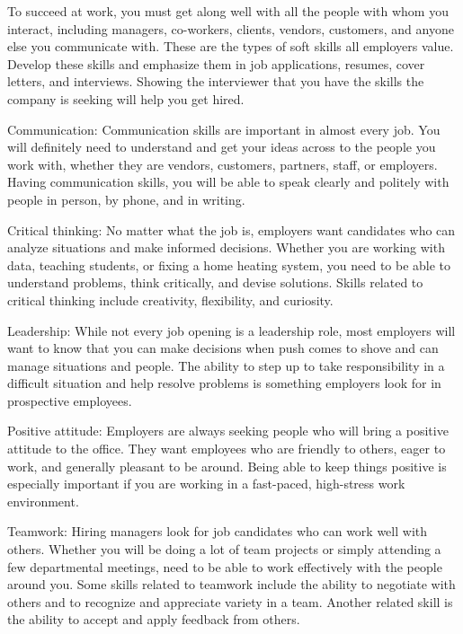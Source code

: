 \documentclass[12pt,a4paper,twoside]{article}
\newenvironment{readingpassage}[1][]{%
    \begin{tcolorbox}[enhanced, colback=grayLight, colframe=secondaryBlue,
        coltitle=textDark, fonttitle=\bfseries, title={#1},
        rounded corners, arc=3mm, boxrule=1pt,
        left=15pt, right=15pt, top=10pt, bottom=10pt,
        breakable, before skip=10pt, after skip=10pt, drop fuzzy shadow]
    \setstretch{1.3}
}{\end{tcolorbox}}
\begin{document}
\begin{readingpassage}[]
To succeed at work, you must get along well with all the people with whom you interact, including managers, co-workers, clients, vendors, customers, and anyone else you communicate with. These are the types of soft skills all employers value. Develop these skills and emphasize them in job applications, resumes, cover letters, and interviews. Showing the interviewer that you have the skills the company is seeking will help you get hired.

Communication: Communication skills are important in almost every job. You will definitely need to understand and get your ideas across to the people you work with, whether they are vendors, customers, partners, staff, or employers. Having communication skills, you will be able to speak clearly and politely with people in person, by phone, and in writing.

Critical thinking: No matter what the job is, employers want candidates who can analyze situations and make informed decisions. Whether you are working with data, teaching students, or fixing a home heating system, you need to be able to understand problems, think critically, and devise solutions. Skills related to critical thinking include creativity, flexibility, and curiosity.

Leadership: While not every job opening is a leadership role, most employers will want to know that you can make decisions when push comes to shove and can manage situations and people. The ability to step up to take responsibility in a difficult situation and help resolve problems is something employers look for in prospective employees.

Positive attitude: Employers are always seeking people who will bring a positive attitude to the office. They want employees who are friendly to others, eager to work, and generally pleasant to be around. Being able to keep things positive is especially important if you are working in a fast-paced, high-stress work environment.

Teamwork: Hiring managers look for job candidates who can work well with others. Whether you will be doing a lot of team projects or simply attending a few departmental meetings, need to be able to work effectively with the people around you. Some skills related to teamwork include the ability to negotiate with others and to recognize and appreciate variety in a team. Another related skill is the ability to accept and apply feedback from others.
\end{readingpassage}
\end{document}
